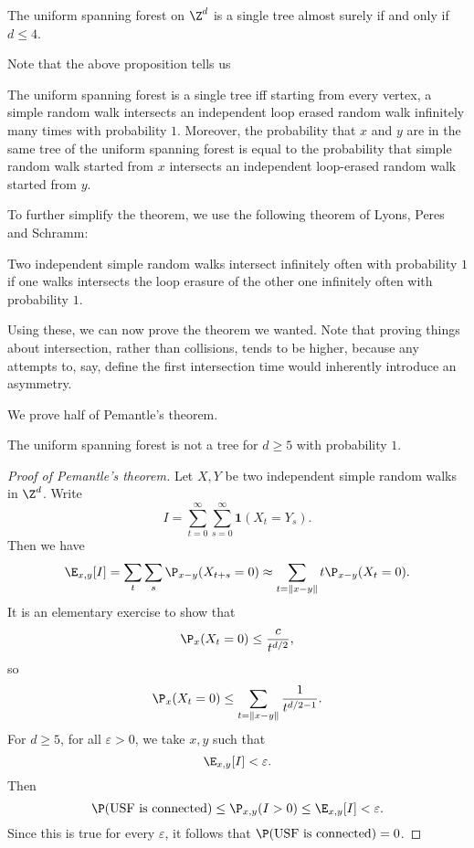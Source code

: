 \documentclass[a4paper]{article}
\begin{document}
\begin{thm}[Pemantle, 1991]
  The uniform spanning forest on $\Z^d$ is a single tree almost surely if and only if $d \leq 4$.
\end{thm}

Note that the above proposition tells us
\begin{prop}[Pemantle]
  The uniform spanning forest is a single tree iff starting from every vertex, a simple random walk intersects an independent loop erased random walk infinitely many times with probability $1$. Moreover, the probability that $x$ and $y$ are in the same tree of the uniform spanning forest is equal to the probability that simple random walk started from $x$ intersects an independent loop-erased random walk started from $y$.
\end{prop}

To further simplify the theorem, we use the following theorem of Lyons, Peres and Schramm:
\begin{thm}
  Two independent simple random walks intersect infinitely often with probability $1$ if one walks intersects the loop erasure of the other one infinitely often with probability $1$.
\end{thm}

Using these, we can now prove the theorem we wanted. Note that proving things about intersection, rather than collisions, tends to be higher, because any attempts to, say, define the first intersection time would inherently introduce an asymmetry.

We prove half of Pemantle's theorem.
\begin{thm}
  The uniform spanning forest is not a tree for $d \geq 5$ with probability $1$.
\end{thm}

\begin{proof}[Proof of Pemantle's theorem]
  Let $X, Y$ be two independent simple random walks in $\Z^d$. Write
  \[
    I = \sum_{t = 0}^\infty \sum_{s = 0}^\infty \mathbf{1}(X_t = Y_s).
  \]
  Then we have
  \[
    \E_{x, y}[I] = \sum_t \sum_s \P_{x - y} (X_{t + s} = 0) \approx \sum_{t = \|x - y\|} t \P_{x - y}(X_t = 0).
  \]
  It is an elementary exercise to show that
  \[
    \P_x(X_t = 0) \leq \frac{c}{t^{d/2}},
  \]
  so
  \[
    \P_x(X_t = 0) \leq \sum_{t = \|x - y\|} \frac{1}{t^{d/2 - 1}}.
  \]
  For $d \geq 5$, for all $\varepsilon > 0$, we take $x, y$ such that
  \[
    \E_{x, y} [I] < \varepsilon.
  \]
  Then
  \[
    \P(\text{USF is connected}) \leq \P_{x, y}(I > 0) \leq \E_{x, y}[I] < \varepsilon.
  \]
  Since this is true for every $\varepsilon$, it follows that $\P(\text{USF is connected}) = 0$.
\end{proof}

\printindex
\end{document}

